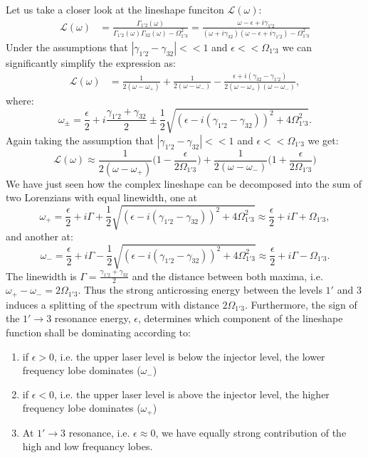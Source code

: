 \documentclass[10pt,english,fleqn]{article}%
\begin{document}
\noindent
Let us take a closer look at the lineshape funciton $\mathcal{L}(\omega)$:
\begin{align}
 \mathcal{L} (\omega) &=  \frac{\Gamma_{1'2}(\omega)}{\Gamma_{1'2}(\omega)\Gamma_{32}(\omega) - \Omega_{1'3}^2} = \frac{\omega - \epsilon +i\gamma_{1'2}}{(\omega + i\gamma_{32})(\omega -\epsilon + i\gamma_{1'2}) -\Omega_{1'3}^2}
\end{align}
Under the assumptions that $ |\gamma_{1'2}-\gamma_{32}| << 1$ and $\epsilon << \Omega_{1'3}$ we can significantly simplify the expression as:
\begin{align}
 \mathcal{L} (\omega) &=  \frac{1}{2(\omega - \omega_{+})} + \frac{1}{2(\omega - \omega_{-})}  - \frac{\epsilon +i (\gamma_{32}-\gamma_{1'2})}{2(\omega - \omega_{+})(\omega-\omega_{-})}, 
\end{align}
where:
$$
\omega_{\pm} = \frac{\epsilon}{2} +i \frac{\gamma_{1'2}+\gamma_{32}}{2} \pm  \frac{1}{2}\sqrt{ (\epsilon -i(\gamma_{1'2}-\gamma_{32}) )^2+4\Omega_{1'3}^2}.
$$
Again taking the assumption that $ |\gamma_{1'2}-\gamma_{32}| << 1$ and $\epsilon << \Omega_{1'3}$ we get:
$$
 \mathcal{L} (\omega) \approx  \frac{1}{2(\omega - \omega_{+})}\big(1 - \frac{\epsilon}{2\Omega_{1'3}}\big) + \frac{1}{2(\omega - \omega_{-})}\big(1 + \frac{\epsilon}{2\Omega_{1'3}}\big)   
$$
We have just seen how the complex lineshape can be decomposed into the sum of two Lorenzians with equal linewidth, one  at 
$$
\omega_{+} = \frac{\epsilon}{2} +i \Gamma + \frac{1}{2}\sqrt{ (\epsilon -i(\gamma_{1'2}-\gamma_{32}) )^2+4\Omega_{1'3}^2} \approx  \frac{\epsilon}{2} +i \Gamma +\Omega_{1'3},
$$ 
and another at:
$$
\omega_{-} = \frac{\epsilon}{2} +i \Gamma - \frac{1}{2}\sqrt{ (\epsilon -i(\gamma_{1'2}-\gamma_{32}) )^2+4\Omega_{1'3}^2} \approx  \frac{\epsilon}{2} +i \Gamma -\Omega_{1'3}.
$$ 
The linewidth is $\Gamma = \frac{\gamma_{1'2}+\gamma_{32}}{2}$ and the distance between both maxima, i.e. $\omega_{+}-\omega_{-} = 2\Omega_{1'3}$. Thus the strong anticrossing energy between the levels $1'$ and $3$ induces a splitting of the spectrum with distance $2\Omega_{1'3}$. Furthermore, the  sign of the $1'\rightarrow 3$ resonance energy, $\epsilon$, determines which component of the lineshape function shall be dominating according to:
\begin{enumerate} 
	\item{if $\epsilon > 0$, i.e. the upper laser level is below the injector level, the lower frequency lobe dominates ($\omega_{-}$)} 
	\item{if $\epsilon < 0$, i.e. the upper laser level is above  the injector level, the higher frequency lobe dominates ($\omega_{+}$)}
	\item{At $1'\rightarrow 3$ resonance, i.e. $\epsilon \approx 0$, we have equally strong contribution of the high and low frequancy lobes.}
\end{enumerate}
\end{document}
